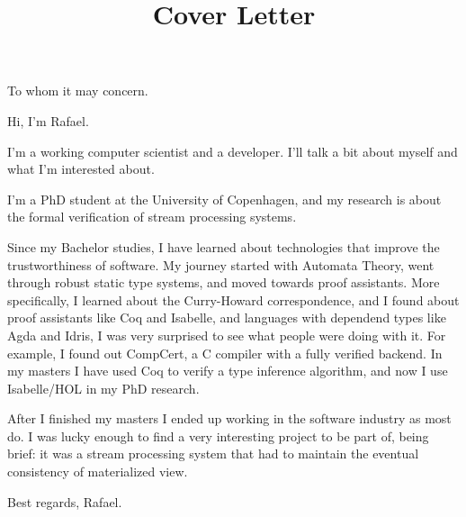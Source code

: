 \documentclass[11pt,a4paper,sans]{moderncv}
\title{Cover Letter}
\begin{document}
\makecvtitle %
To whom it may concern.

\medskip

Hi, I'm Rafael.

\medskip

I'm a working computer scientist and a developer.
I'll talk a bit about myself and what I'm interested about.

\medskip
I'm a PhD student at the University of Copenhagen, and my research is about the formal verification of stream processing systems.

Since my Bachelor studies, I have learned about technologies that improve the trustworthiness of software.
My journey started with Automata Theory, went through robust static type systems, and moved towards proof assistants.
More specifically, I learned about the Curry-Howard correspondence, and I found about proof assistants like Coq and Isabelle, and languages with dependend types like Agda and Idris, I was very surprised to see what people were doing with it.
For example, I found out CompCert, a C compiler with a fully verified backend.
In my masters I have used Coq to verify a type inference algorithm, and now I use Isabelle/HOL in my PhD research.

\medskip

After I finished my masters I ended up working in the software industry as most do.
I was lucky enough to find a very interesting project to be part of, being brief: it was a stream processing system that had to maintain the eventual consistency of materialized view.

\medskip

Best regards, Rafael.
\end{document}
